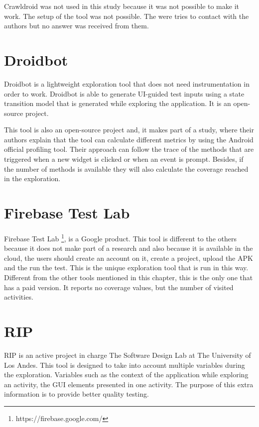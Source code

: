 Crawldroid was not used in this study because it was not possible to make it work. The setup of the tool was not possible. The were tries to contact with the authors but no answer was received from them.

\section{Droidbot}\label{sec:droidbot}

Droidbot \cite{droidbot} is a lightweight exploration tool that does not need instrumentation in order to work. Droidbot is able to generate UI-guided test inputs using a state transition model that is generated while exploring the application. It is an open-source project.

This tool is also an open-source project and, it makes part of a study, where their authors explain that the tool can calculate different metrics by using the Android official profiling tool. Their approach can follow the trace of the methods that are triggered when a new widget is clicked or when an event is prompt. Besides, if the number of methods is available they will also calculate the coverage reached in the exploration.

\section{Firebase Test Lab}\label{sec:testlab}

Firebase Test Lab \footnote{https://firebase.google.com/}, is a Google product. This tool is different to the others because it does not make part of a research and also because it is available in the cloud, the users should create an account on it, create a project, upload the APK and the run the test. This is the unique exploration tool that is run in this way. Different from the other tools mentioned in this chapter, this is the only one that has a paid version. It reports no coverage values, but the number of visited activities.

\section{RIP}\label{sec:rip}

RIP \cite{Liñán} is an active project in charge The Software Design Lab at The University of Los Andes. This tool is designed to take into account multiple variables during the exploration. Variables such as the context of the application while exploring an activity, the GUI elements presented in one activity. The purpose of this extra information is to provide better quality testing.

